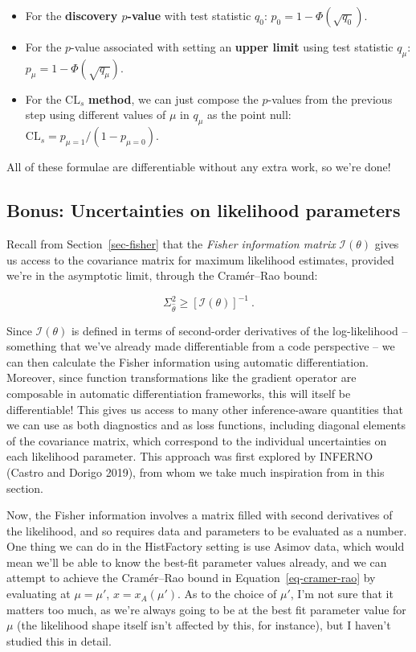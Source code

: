 \documentclass[
  11pt,
  numbers=noendperiod]{book}
\providecommand{\tightlist}{%
  \setlength{\itemsep}{0pt}\setlength{\parskip}{0pt}}\usepackage{longtable,booktabs,array}
\begin{document}
\begin{itemize}
\tightlist
\item
  For the \textbf{discovery \(p\)-value} with test statistic \(q_0\):
  \(p_0 = 1-\Phi(\sqrt{q_0})\).
\item
  For the \(p\)-value associated with setting an \textbf{upper limit}
  using test statistic \(q_\mu\): \(p_\mu = 1-\Phi(\sqrt{q_\mu})\).
\item
  For the \(\text{CL}_s\) \textbf{method}, we can just compose the
  \(p\)-values from the previous step using different values of \(\mu\)
  in \(q_\mu\) as the point null:
  \(\text{CL}_s = p_{\mu=1} / (1-p_{\mu=0})\).
\end{itemize}

All of these formulae are differentiable without any extra work, so
we're done!

\hypertarget{sec-inferno}{%
\subsection{Bonus: Uncertainties on likelihood
parameters}\label{sec-inferno}}

Recall from Section~\ref{sec-fisher} that the \emph{Fisher information
matrix} \(\mathcal{I}(\theta)\) gives us access to the covariance matrix
for maximum likelihood estimates, provided we're in the asymptotic
limit, through the Cramér--Rao bound:

\[
\Sigma_{\hat{\theta}}^{2} \geqslant [\mathcal{I}(\theta)]^{-1}~.
\]

Since \(\mathcal{I}(\theta)\) is defined in terms of second-order
derivatives of the log-likelihood -- something that we've already made
differentiable from a code perspective -- we can then calculate the
Fisher information using automatic differentiation. Moreover, since
function transformations like the gradient operator are composable in
automatic differentiation frameworks, this will itself be
differentiable! This gives us access to many other inference-aware
quantities that we can use as both diagnostics and as loss functions,
including diagonal elements of the covariance matrix, which correspond
to the individual uncertainties on each likelihood parameter. This
approach was first explored by INFERNO (Castro and Dorigo 2019), from
whom we take much inspiration from in this section.

Now, the Fisher information involves a matrix filled with second
derivatives of the likelihood, and so requires data and parameters to be
evaluated as a number. One thing we can do in the HistFactory setting is
use Asimov data, which would mean we'll be able to know the best-fit
parameter values already, and we can attempt to achieve the Cramér--Rao
bound in Equation~\ref{eq-cramer-rao} by evaluating at \(\mu=\mu'\),
\(x=x_A(\mu')\). As to the choice of \(\mu'\), I'm not sure that it
matters too much, as we're always going to be at the best fit parameter
value for \(\mu\) (the likelihood shape itself isn't affected by this,
for instance), but I haven't studied this in detail.
\end{document}
